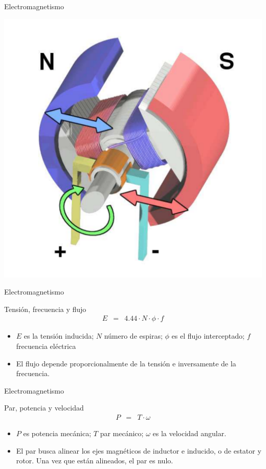 \documentclass[xcolor={usenames,svgnames,dvipsnames}]{beamer}
\begin{document}
\begin{frame}[label={sec:orgc17031f}]{Electromagnetismo}
\begin{center}
\includegraphics[width=.9\linewidth]{../figs/Electric_motor_cycle_3.pdf}
\end{center}
\end{frame}

\begin{frame}[label={sec:orgc94fad1}]{Electromagnetismo}
\begin{block}{Tensión, frecuencia y flujo}
$$\begin{aligned}
  E & = & 4.44\cdot N\cdot\phi\cdot f\end{aligned}$$

\begin{itemize}
\item \(E\) es la tensión inducida; \(N\) número de espiras; \(\phi\) es el flujo
interceptado; \(f\) frecuencia eléctrica

\item El flujo depende proporcionalmente de la tensión e inversamente de la
frecuencia.
\end{itemize}
\end{block}
\end{frame}

\begin{frame}[label={sec:org0988c88}]{Electromagnetismo}
\begin{block}{Par, potencia y velocidad}
$$\begin{aligned}
  P & = & T\cdot\omega\end{aligned}$$

\begin{itemize}
\item \(P\) es potencia mecánica; \(T\) par mecánico; \(\omega\) es la velocidad
angular.

\item El par busca alinear los ejes magnéticos de inductor e inducido, o de
estator y rotor. Una vez que están alineados, el par es nulo.
\end{itemize}
\end{block}
\end{frame}
\end{document}
